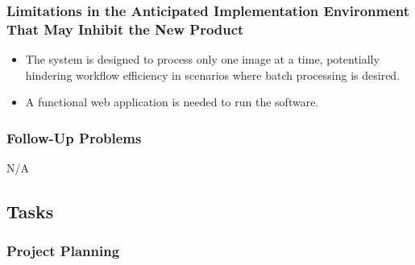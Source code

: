 \documentclass[12pt]{article}
\begin{document}
\subsubsection{Limitations in the Anticipated Implementation Environment That May
Inhibit the New Product}
\begin{itemize}
    \item The system is designed to process only one image at a time, potentially hindering workflow efficiency in scenarios where batch processing is desired. 
    \item A functional web application is needed to run the software. 
\end{itemize}
\subsubsection{Follow-Up Problems}
    N/A

\subsection{Tasks}

\subsubsection{Project Planning}
\end{document}
